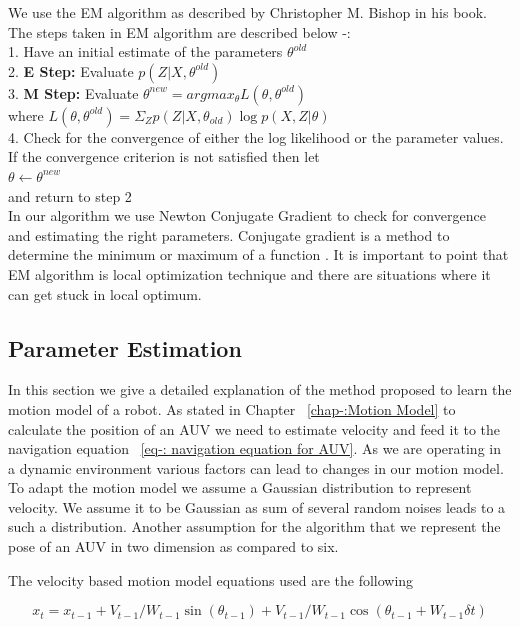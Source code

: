 \documentclass[12pt]{dalcsthesis}
\begin{document}
We use the EM algorithm as described by Christopher M. Bishop\cite{bishop2006pattern} in his book. The steps taken in EM algorithm are described below -:
\\
1. Have an initial estimate of the parameters $\theta ^{old}$
\\
2. \textbf{E Step:} Evaluate $p(Z|X,\theta^{old})$
\\
3. \textbf{M Step:} Evaluate $\theta ^{new} = arg max _{\theta} L(\theta,\theta^{old})$
\\
\hspace*{20 mm} where 
$L(\theta,\theta^{old})=\Sigma _{Z} p(Z|X,\theta_{old}) \log p(X,Z|\theta)$
\\
4. Check for the convergence of either the log likelihood or the parameter values. If the convergence criterion is not satisfied then let
\\
\hspace*{20 mm} $\theta \leftarrow \theta^{new} $
\\
and return to step 2
\\
In our algorithm we use Newton Conjugate Gradient to check for convergence and estimating	 the right parameters. Conjugate gradient is a method to determine the minimum or maximum of a function \cite{shewchuk1994introduction}. It is important to point that EM algorithm is local optimization technique and there are situations where it can get stuck in local optimum. 		


\subsection{Parameter Estimation}
\label{ch:adapting the motion model}
In this section we give a detailed explanation of the method proposed to learn the motion model of a robot. As stated in Chapter ~\ref{chap-:Motion Model} to calculate the position of an AUV we need to estimate velocity and feed it to the navigation equation ~\ref{eq-: navigation equation for AUV}. As we are operating in a dynamic environment various factors can lead to changes in our motion model. To adapt the motion model we assume a Gaussian distribution to represent velocity. We assume it to be Gaussian as sum of several random noises leads to a such a distribution. Another assumption for the algorithm that we represent the pose of an AUV in two dimension as compared to six. 

The velocity based motion model equations used are the following

\begin{equation}
 x_{t}=x_{t-1}+V_{t-1}/W_{t-1} \sin(\theta_{t-1})+ V_{t-1}/W_{t-1} \cos(\theta_{t-1} + W_{t-1} \delta t)
\end{equation}
\end{document}
